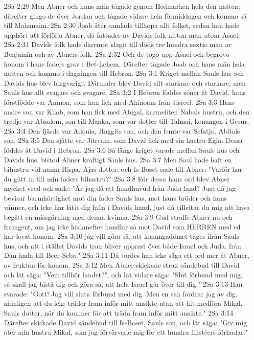 2Sa 2:29  Men Abner och hans män tågade genom Hedmarken hela den natten; därefter gingo de över Jordan och tågade vidare hela förmiddagen och kommo så till Mahanaim.
2Sa 2:30  Joab åter samlade tillhopa allt folket, sedan han hade upphört att förfölja Abner; då fattades av Davids folk nitton man utom Asael.
2Sa 2:31  Davids folk hade däremot slagit till döds tre hundra sextio man av Benjamin och av Abners folk.
2Sa 2:32  Och de togo upp Asael och begrovo honom i hans faders grav i Bet-Lehem. Därefter tågade Joab och hans män hela natten och kommo i dagningen till Hebron.
2Sa 3:1  Kriget mellan Sauls hus och Davids hus blev långvarigt. Därunder blev David allt starkare och starkare, men Sauls hus allt svagare och svagare.
2Sa 3:2  I Hebron föddes söner åt David. hans förstfödde var Amnon, som han fick med Ahinoam från Jisreel.
2Sa 3:3  Hans andre son var Kilab, som han fick med Abigal, karmeliten Nabals hustru, och den tredje var Absalom, son till Maaka, som var dotter till Talmai, konungen i Gesur.
2Sa 3:4  Den fjärde var Adonia, Haggits son, och den femte var Sefatja, Abitals son.
2Sa 3:5  Den sjätte var Jitream, som David fick med sin hustru Egla. Dessa föddes åt David i Hebron.
2Sa 3:6  Så länge kriget varade mellan Sauls hus och Davids hus, bistod Abner kraftigt Sauls hus.
2Sa 3:7  Men Saul hade haft en bihustru vid namn Rispa, Ajas dotter; och Is-Boset sade till Abner: "Varför har du gått in till min faders bihustru?"
2Sa 3:8  För dessa hans ord blev Abner mycket vred och sade: "Är jag då ett hundhuvud från Juda land? Just då jag bevisar barmhärtighet mot din fader Sauls hus, mot hans bröder och hans vänner, och icke har låtit dig falla i Davids hand, just då tillvitar du mig att hava begått en missgärning med denna kvinna.
2Sa 3:9  Gud straffe Abner nu och framgent, om jag icke hädanefter handlar så mot David som HERREN med ed har lovat honom:
2Sa 3:10  jag vill göra så, att konungadömet tages ifrån Sauls hus, och att i stället Davids tron bliver upprest över både Israel och Juda, från Dan ända till Beer-Seba."
2Sa 3:11  Då tordes han icke säga ett ord mer åt Abner, av fruktan för honom.
2Sa 3:12  Men Abner skickade strax sändebud till David och lät säga: "Vem tillhör landet?", och lät vidare säga: "Slut förbund med mig, så skall jag bistå dig och göra så, att hela Israel går över till dig."
2Sa 3:13  Han svarade: "Gott! Jag vill sluta förbund med dig. Men en sak fordrar jag av dig, nämligen att du icke träder fram inför mitt ansikte utan att hit medföra Mikal, Sauls dotter, när du kommer för att träda fram inför mitt ansikte."
2Sa 3:14  Därefter skickade David sändebud till Is-Boset, Sauls son, och lät säga: "Giv mig åter min hustru Mikal, som jag förvärvade mig för ett hundra filistéers förhudar."
